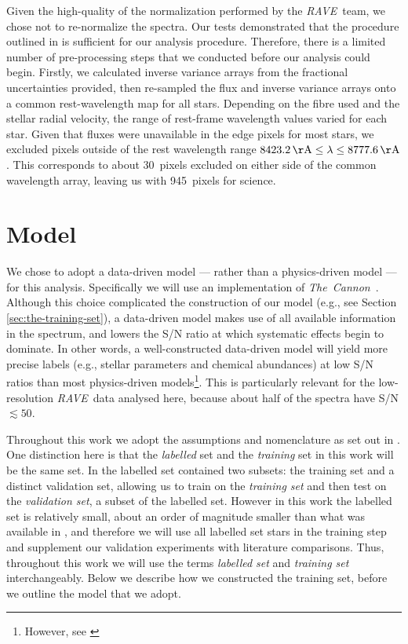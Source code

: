 \documentclass[preprint,trackchanges]{aastex}
\newcommand{\project}[1]{\textsl{#1}}
\newcommand{\thecannon}{\project{The~Cannon}}
\newcommand{\acronym}[1]{{\small{#1}}}
\newcommand{\rave}{\project{\acronym{RAVE}}}
\begin{document}
Given the high-quality of the normalization performed by the \rave\ team, we chose
not to re-normalize the spectra.  Our tests demonstrated that the procedure 
outlined in \citet{Kunder_2016} is sufficient for our analysis procedure. Therefore,
there is a limited number of pre-processing steps that we conducted before our
analysis could begin.  Firstly, we calculated inverse variance arrays from the
fractional uncertainties provided, then re-sampled the flux and inverse variance
arrays onto a common rest-wavelength map for all stars.  Depending on the fibre 
used and the stellar radial velocity, the range of rest-frame wavelength values
varied for each star.  Given that fluxes were unavailable in the edge pixels for 
most stars, we excluded pixels outside of the rest wavelength range 
$8423.2\,{\rm \AA} \le \lambda \le 8777.6\,{\rm \AA}$.  This corresponds to about
30~pixels excluded on either side of the common wavelength array, leaving us with
945~pixels for science.


\section{Model}
\label{sec:model}

We chose to adopt a data-driven model --- rather than a physics-driven model ---
for this analysis.  Specifically we will use an implementation of \thecannon\
\citep{Ness_2015,Ness_2016}.  Although this choice complicated the construction 
of our model (e.g., see Section \ref{sec:the-training-set}), a data-driven model 
makes use of all available information in the spectrum, and lowers the S/N ratio 
at which systematic effects begin to dominate.  In other words, a well-constructed
data-driven model will yield more precise labels (e.g., stellar parameters and
chemical abundances) at low S/N ratios than most physics-driven models\footnote{
However, see \citet{Casey_2016a}}.  This is particularly relevant for the 
low-resolution \rave\ data analysed here, because about half of the spectra have
S/N $\lesssim 50$. 


Throughout this work we adopt the assumptions and nomenclature as set out in
\citet{Casey_2016b}.  One distinction here is that the \emph{labelled} set and
the \emph{training} set in this work will be the same set.  In \citet{Casey_2016b}
the labelled set contained two subsets: the training set and a distinct
validation set, allowing us to train on the \emph{training set} and then test
on the \emph{validation set}, a subset of the labelled set.  However in this work
the labelled set is relatively small, about an order of magnitude smaller than 
what was available in \citet{Casey_2016b}, and therefore we will use all labelled 
set stars in the training step and supplement our validation experiments with 
literature comparisons.  Thus, throughout this work we will use the terms 
\emph{labelled set} and \emph{training set} interchangeably.  Below we describe 
how we constructed the training set, before we outline the model that we adopt.
\end{document}
